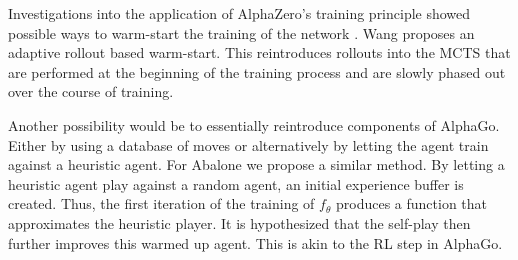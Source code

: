 Investigations into the application of AlphaZero's training principle showed possible ways to warm-start the training of the network \cite{wang_adaptive_2021}. Wang proposes an adaptive rollout based warm-start. This reintroduces rollouts into the MCTS that are performed at the beginning of the training process and are slowly phased out over the course of training.

Another possibility would be to essentially reintroduce components of AlphaGo. Either by using a database of moves or alternatively by letting the agent train against a heuristic agent. For Abalone we propose a similar method. By letting a heuristic agent play against a random agent, an initial experience buffer is created. Thus, the first iteration of the training of $f_{\theta}$ produces a function that approximates the heuristic player. It is hypothesized that the self-play then further improves this warmed up agent. This is akin to the RL step in AlphaGo.
